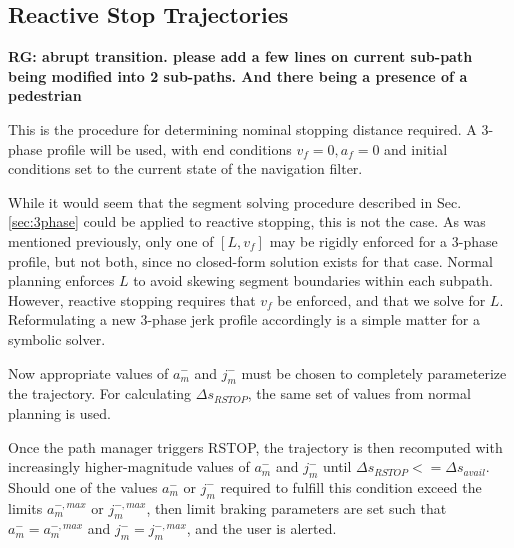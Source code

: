\documentclass[letterpaper, 10 pt, conference]{ieeeconf}  %
\begin{document}


\subsection{Reactive Stop Trajectories} \label{sec:reactivestoptrajectory}

\textbf{RG: abrupt transition. please add a few lines on current sub-path being modified into 2 sub-paths. And there being a presence of a pedestrian}

This is the procedure for determining nominal stopping distance required.
A 3-phase profile will be used, with end conditions $v_f=0, a_f=0$ and initial conditions set to the current state of the navigation filter.

While it would seem that the segment solving procedure described in Sec. \ref{sec:3phase} could be applied to reactive stopping, this is not the case.
As was mentioned previously, only one of $[L, v_f]$ may be rigidly enforced for a 3-phase profile, but not both, since no closed-form solution exists for that case.
Normal planning enforces $L$ to avoid skewing segment boundaries within each subpath.
However, reactive stopping requires that $v_f$ be enforced, and that we solve for $L$.
Reformulating a new 3-phase jerk profile accordingly is a simple matter for a symbolic solver.

Now appropriate values of $a_m^-$ and $j_m^-$ must be chosen to completely parameterize the trajectory.
For calculating $\Delta s_{RSTOP}$, the same set of values from normal planning is used.

Once the path manager triggers RSTOP, the trajectory is then recomputed with increasingly higher-magnitude values of $a_m^-$ and $j_m^-$ until $\Delta s_{RSTOP} <= \Delta s_{avail}$.
Should one of the values $a_m^-$ or $j_m^-$ required to fulfill this condition exceed the limits $a_m^{-,max}$ or $j_m^{-,max}$, then limit braking parameters are set such that $a_m^-=a_m^{-,max}$ and $j_m^-=j_m^{-,max}$, and the user is alerted.
\end{document}
